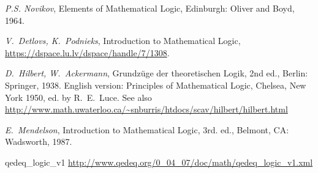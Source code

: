\documentclass[a4paper,german,10pt,twoside]{book}
\theoremstyle{definition}
\theoremstyle{remark}
\begin{document}
\begin{thebibliography}{99}
 \emph{P.S. Novikov}, Elements of Mathematical Logic, Edinburgh: Oliver and Boyd, 1964.

 \emph{V.~Detlovs, K.~Podnieks}, Introduction to Mathematical Logic, 
\url{ https://dspace.lu.lv/dspace/handle/7/1308}.

 \emph{D.~Hilbert, W.~Ackermann}, Grundz{\"u}ge der theoretischen Logik, 2nd ed., Berlin: Springer, 1938. English version: Principles of Mathematical Logic, Chelsea, New York 1950, ed. by R.~E.~Luce.
           See also \url{http://www.math.uwaterloo.ca/~snburris/htdocs/scav/hilbert/hilbert.html}

 \emph{E.~Mendelson}, Introduction to Mathematical Logic, 3rd. ed., Belmont, CA: Wadsworth, 1987.



 qedeq\_logic\_v1 \url{http://www.qedeq.org/0_04_07/doc/math/qedeq_logic_v1.xml}


\end{thebibliography}
 \printindex
\end{document}
